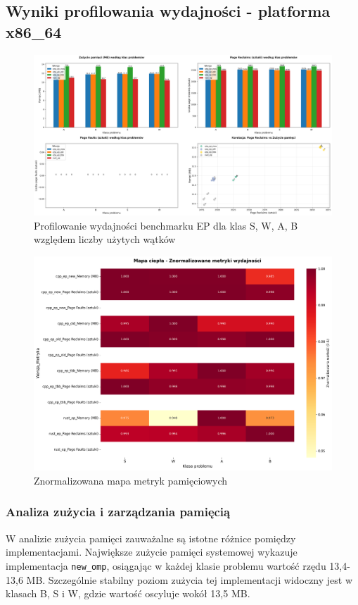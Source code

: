 \subsection{Wyniki profilowania wydajności - platforma x86\_64}
\begin{figure}[H]
    \centering
    \includegraphics[width=\textwidth]{analiza/images/parallel/ep/x86/chart_01_memory_comparison.png}
    \caption{Profilowanie wydajności benchmarku EP dla klas S, W, A, B względem liczby użytych wątków}
    \label{ep_porownanie_zuzycia_pamieci_x86_64}
\end{figure}
\begin{figure}[H]
    \centering
    \includegraphics[width=\textwidth]{analiza/images/parallel/ep/x86/chart_03_heatmap.png}
    \caption{Znormalizowana mapa metryk pamięciowych}
    \label{ep_znormalizowana_mapa_metryk}
\end{figure}
\subsubsection{Analiza zużycia i zarządzania pamięcią}
W analizie zużycia pamięci zauważalne są istotne różnice pomiędzy implementacjami. Największe zużycie pamięci systemowej wykazuje implementacja \texttt{new\_omp}, osiągając w każdej klasie problemu wartość rzędu 13,4-13,6 MB. Szczególnie stabilny poziom zużycia tej implementacji widoczny jest w klasach B, S i W, gdzie wartość oscyluje wokół 13,5 MB.

